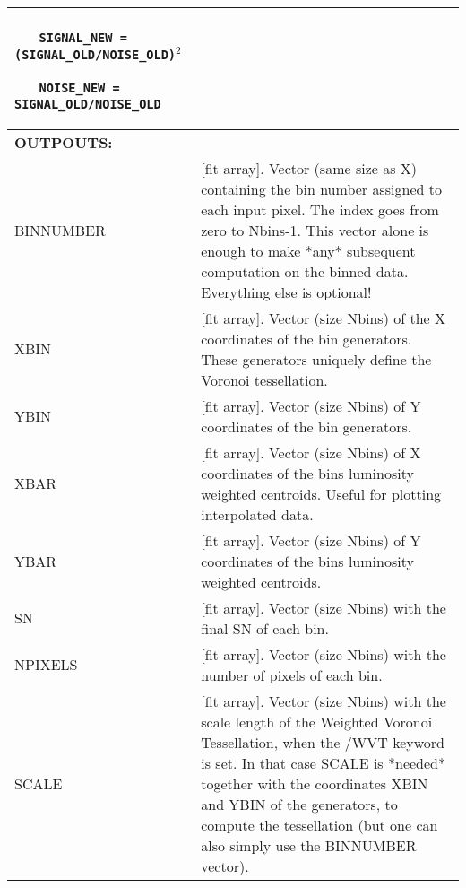 \begin{center}
\begin{longtable}{p{2.7cm}| p{11.1cm}}
                 \medskip

                  \ \ \ {\tt SIGNAL\_NEW = (SIGNAL\_OLD/NOISE\_OLD)}$^2$

                \medskip

                  \ \ \ {\tt NOISE\_NEW = SIGNAL\_OLD/NOISE\_OLD}   \\
\hline
{\bf  OUTPOUTS:}        &    \\
   BINNUMBER &[flt array]. Vector (same size as X) containing the bin number assigned
           to each input pixel. The index goes from zero to Nbins-1.
           This vector alone is enough to make *any* subsequent
           computation on the binned data. Everything else is optional!\\
%
     XBIN &[flt array].  Vector (size Nbins) of the X coordinates of the bin generators.
           These generators uniquely define the Voronoi tessellation.\\
%
     YBIN &[flt array].  Vector (size Nbins) of Y coordinates of the bin generators.\\
%
     XBAR &[flt array].  Vector (size Nbins) of X coordinates of the bins luminosity
           weighted centroids. Useful for plotting interpolated data.\\
%
     YBAR &[flt array].  Vector (size Nbins) of Y coordinates of the bins luminosity
           weighted centroids.\\
%
       SN &[flt array].  Vector (size Nbins) with the final SN of each bin.\\
%
  NPIXELS &[flt array].  Vector (size Nbins) with the number of pixels of each bin.\\
%
    SCALE &[flt array].  Vector (size Nbins) with the scale length of the Weighted
           Voronoi Tessellation, when the /WVT keyword is set.
           In that case SCALE is *needed* together with the coordinates
           XBIN and YBIN of the generators, to compute the tessellation
           (but one can also simply use the BINNUMBER vector).\\
\hline
\end{longtable}
\end{center}

